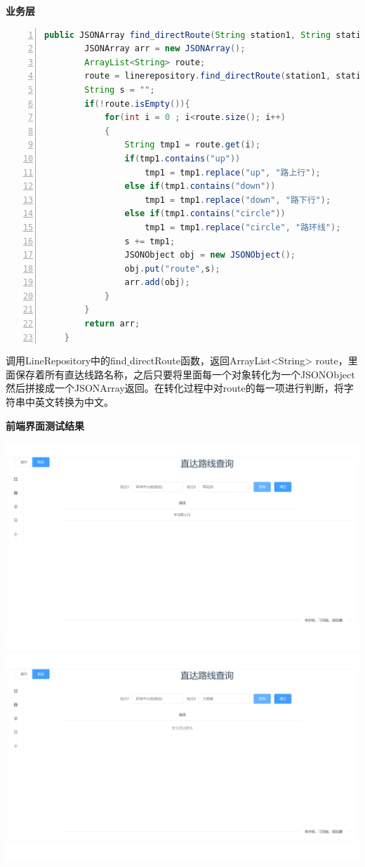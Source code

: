 \documentclass[11pt,a4paper]{article}
\begin{document}
\textbf{业务层} \\
\begin{lstlisting}[numbers = left, 
showstringspaces=false,
showspaces = false,
breaklines = true, 
language=Java]
    public JSONArray find_directRoute(String station1, String station2){
        JSONArray arr = new JSONArray();
        ArrayList<String> route;
        route = linerepository.find_directRoute(station1, station2);
        String s = "";
        if(!route.isEmpty()){
            for(int i = 0 ; i<route.size(); i++)
            {
                String tmp1 = route.get(i);
                if(tmp1.contains("up"))
                    tmp1 = tmp1.replace("up", "路上行");
                else if(tmp1.contains("down"))
                    tmp1 = tmp1.replace("down", "路下行");
                else if(tmp1.contains("circle"))
                    tmp1 = tmp1.replace("circle", "路环线");
                s += tmp1;
                JSONObject obj = new JSONObject();
                obj.put("route",s);
                arr.add(obj);
            }
        }
        return arr;
    }
\end{lstlisting} 
调用LineRepository中的find$\_$directRoute函数，返回ArrayList<String> route，里面保存着所有直达线路名称，之后只要将里面每一个对象转化为一个JSONObject然后拼接成一个JSONArray返回。在转化过程中对route的每一项进行判断，将字符串中英文转换为中文。

\textbf{前端界面测试结果} \\
\begin{center}
\centering
\includegraphics[scale=0.3]{./assets/demand6_1.png} \\ 
\includegraphics[scale=0.3]{./assets/demand6_2.png} 
\end{center}
\end{document}
